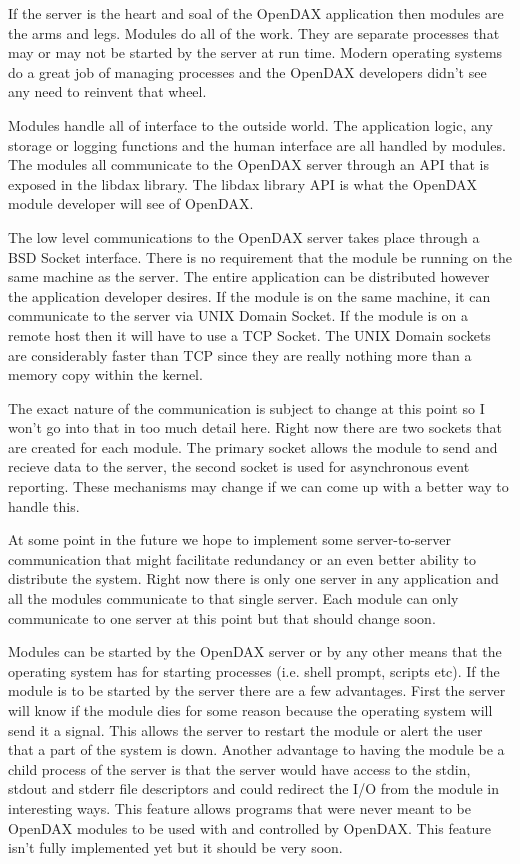 \documentclass[10pt,letterpaper]{report}
\begin{document}
If the server is the heart and soal of the OpenDAX application then modules are the arms and legs.  Modules do all of the work.  They are separate processes that may or may not be started by the server at run time.  Modern operating systems do a great job of managing processes and the OpenDAX developers didn't see any need to reinvent that wheel.  

Modules handle all of interface to the outside world.  The application logic, any storage or logging functions and the human interface are all handled by modules.  The modules all communicate to the OpenDAX server through an API that is exposed in the libdax library.  The libdax library API is what the OpenDAX module developer will see of OpenDAX.

The low level communications to the OpenDAX server takes place through a BSD Socket interface.  There is no requirement that the module be running on the same machine as the server.  The entire application can be distributed however the application developer desires.  If the module is on the same machine, it can communicate to the server via UNIX Domain Socket.  If the module is on a remote host then it will have to use a TCP Socket.  The UNIX Domain sockets are considerably faster than TCP since they are really nothing more than a memory copy within the kernel.

The exact nature of the communication is subject to change at this point so I won't go into that in too much detail here.  Right now there are two sockets that are created for each module.  The primary socket allows the module to send and recieve data to the server, the second socket is used for asynchronous event reporting.  These mechanisms may change if we can come up with a better way to handle this.

At some point in the future we hope to implement some server-to-server communication that might facilitate redundancy or an even better ability to distribute the system.  Right now there is only one server in any application and all the modules communicate to that single server.  Each module can only communicate to one server at this point but that should change soon.

Modules can be started by the OpenDAX server or by any other means that the operating system has for starting processes (i.e. shell prompt, scripts etc).  If the module is to be started by the server there are a few advantages.  First the server will know if the module dies for some reason because the operating system will send it a signal.  This allows the server to restart the module or alert the user that a part of the system is down.  Another advantage to having the module be a child process of the server is that the server would have access to the stdin, stdout and stderr file descriptors and could redirect the I/O from the module in interesting ways.  This feature allows programs that were never meant to be OpenDAX modules to be used with and controlled by OpenDAX.  This feature isn't fully implemented yet but it should be very soon.
\end{document}
